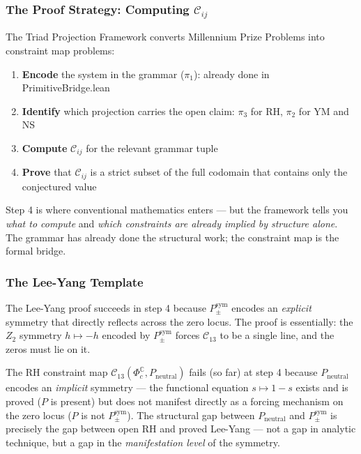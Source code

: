 \documentclass[12pt,a4paper]{article}
\begin{document}
\subsubsection{The Proof Strategy: Computing $\mathcal{C}_{ij}$}

The Triad Projection Framework converts Millennium Prize Problems into constraint map problems:

\begin{enumerate}
    \item \textbf{Encode} the system in the grammar ($\pi_1$): already done in PrimitiveBridge.lean
    \item \textbf{Identify} which projection carries the open claim: $\pi_3$ for RH, $\pi_2$ for YM and NS
    \item \textbf{Compute} $\mathcal{C}_{ij}$ for the relevant grammar tuple
    \item \textbf{Prove} that $\mathcal{C}_{ij}$ is a strict subset of the full codomain that contains only the conjectured value
\end{enumerate}

Step 4 is where conventional mathematics enters --- but the framework tells you \emph{what to compute} and \emph{which constraints are already implied by structure alone}. The grammar has already done the structural work; the constraint map is the formal bridge.

\subsubsection{The Lee-Yang Template}

The Lee-Yang proof succeeds in step 4 because $P_{\pm}^{\text{sym}}$ encodes an \emph{explicit} symmetry that directly reflects across the zero locus. The proof is essentially: the $Z_2$ symmetry $h \mapsto -h$ encoded by $P_{\pm}^{\text{sym}}$ forces $\mathcal{C}_{13}$ to be a single line, and the zeros must lie on it.

The RH constraint map $\mathcal{C}_{13}(\Phi_c^{\mathbb{C}}, P_\text{neutral})$ fails (so far) at step 4 because $P_\text{neutral}$ encodes an \emph{implicit} symmetry --- the functional equation $s \mapsto 1-s$ exists and is proved ($P$ is present) but does not manifest directly as a forcing mechanism on the zero locus ($P$ is not $P_{\pm}^{\text{sym}}$). The structural gap between $P_\text{neutral}$ and $P_{\pm}^{\text{sym}}$ is precisely the gap between open RH and proved Lee-Yang --- not a gap in analytic technique, but a gap in the \emph{manifestation level} of the symmetry.
\end{document}
